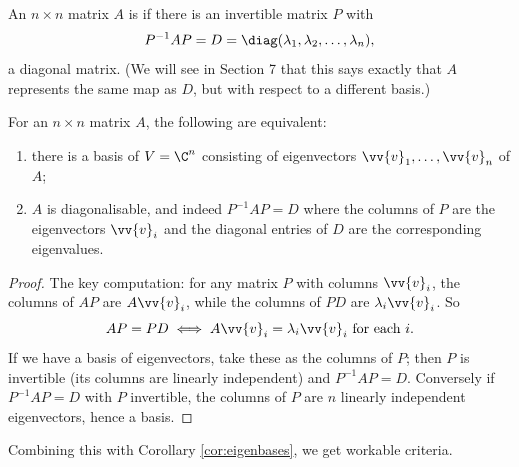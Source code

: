 \begin{definition}[Diagonalisable]
	An $n \times n$ matrix $A$ is  if there is an invertible matrix $P$ with
	$$
	P^{-1}AP = D = \diag(\lambda_1, \lambda_2, \dots, \lambda_n),
	$$
	a diagonal matrix. (We will see in Section 7 that this says exactly that $A$ represents the same map as $D$, but with respect to a different basis.)
\end{definition}

\begin{proposition}
	For an $n \times n$ matrix $A$, the following are equivalent:
	\begin{enumerate}[label=(\roman*)]
		\item there is a basis of $V = \C^n$ consisting of eigenvectors $\vv{v}_1, \dots, \vv{v}_n$ of $A$;
		\item $A$ is diagonalisable, and indeed $P^{-1}AP = D$ where the columns of $P$ are the eigenvectors $\vv{v}_i$ and the diagonal entries of $D$ are the corresponding eigenvalues.
	\end{enumerate}
\end{proposition}
\begin{proof}
	The key computation: for any matrix $P$ with columns $\vv{v}_i$, the columns of $AP$ are $A \vv{v}_i$, while the columns of $PD$ are $\lambda_i \vv{v}_i$. So
	$$
	AP = PD \iff A\vv{v}_i = \lambda_i \vv{v}_i \text{ for each } i.
	$$
	If we have a basis of eigenvectors, take these as the columns of $P$; then $P$ is invertible (its columns are linearly independent) and $P^{-1}AP = D$. Conversely if $P^{-1}AP = D$ with $P$ invertible, the columns of $P$ are $n$ linearly independent eigenvectors, hence a basis.
\end{proof}

Combining this with Corollary \ref{cor:eigenbases}, we get workable criteria.

